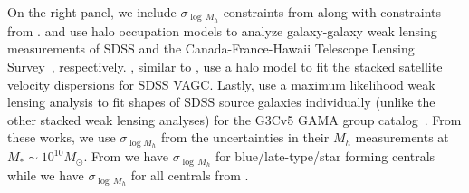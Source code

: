 \documentclass[12pt, letterpaper, preprint, tighten]{aastex62}
\begin{document}
On the right panel, we include $\sigma_{\log\,M_h}$ constraints from \cite{more2011}
along with constraints from \cite{mandelbaum2006a, conroy2007, velander2014, han2015}. 
\cite{mandelbaum2006a} and \cite{velander2014} use halo occupation models to 
analyze galaxy-galaxy weak lensing measurements of SDSS and the 
Canada-France-Hawaii Telescope Lensing Survey~\citep[CFHTLenS;][]{heymans2012}, 
respectively. \cite{conroy2007}, similar to \cite{more2011}, use a halo model 
to fit the stacked satellite velocity dispersions for SDSS VAGC. Lastly, 
\cite{han2015} use a maximum likelihood weak lensing analysis to fit shapes 
of SDSS source galaxies individually (unlike the other stacked weak lensing
analyses) for the G3Cv5 GAMA group catalog~\citep{robotham2011}. From these 
works, we use $\sigma_{\log M_h}$ from the uncertainties in their $M_h$ 
measurements at $M_*{\sim}10^{10}M_\odot$. From 
\cite{mandelbaum2006a, more2011, velander2014} we have $\sigma_{\log\,M_h}$ 
for blue/late-type/star forming centrals while we have $\sigma_{\log\,M_h}$ 
for all centrals from \cite{conroy2007, han2015}. 
\end{document}
